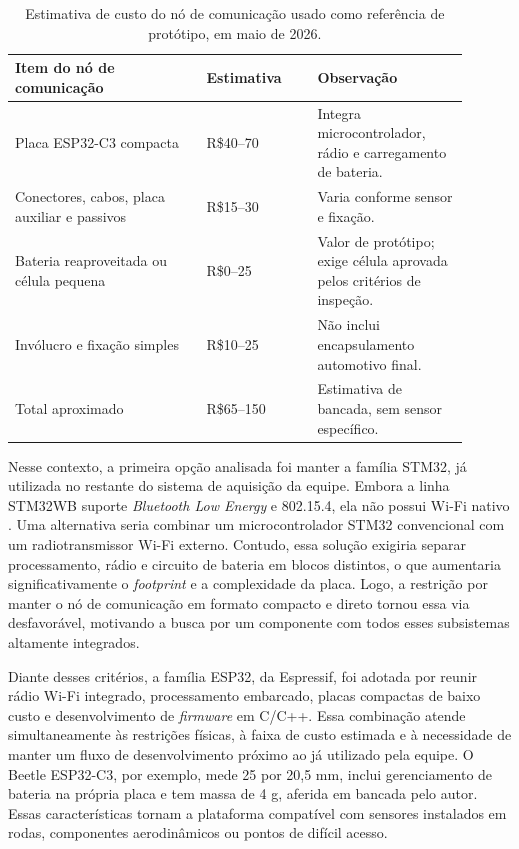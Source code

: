 \begin{table}[htbp]
\centering
\small
\setlength{\tabcolsep}{5pt}
\renewcommand{\arraystretch}{1.12}
\begin{tabular}{p{0.38\linewidth}|p{0.22\linewidth}|p{0.30\linewidth}}
\hline
Item do nó de comunicação & Estimativa & Observação \\
\hline
Placa ESP32-C3 compacta & R\$40--70 & Integra microcontrolador, rádio e carregamento de bateria. \\
\hline
Conectores, cabos, placa auxiliar e passivos & R\$15--30 & Varia conforme sensor e fixação. \\
\hline
Bateria reaproveitada ou célula pequena & R\$0--25 & Valor de protótipo; exige célula aprovada pelos critérios de inspeção. \\
\hline
Invólucro e fixação simples & R\$10--25 & Não inclui encapsulamento automotivo final. \\
\hline
Total aproximado & R\$65--150 & Estimativa de bancada, sem sensor específico. \\
\hline
\end{tabular}
\caption{Estimativa de custo do nó de comunicação usado como referência de protótipo, em maio de 2026.}
\label{tab:bom-no-sensor}
\end{table}

Nesse contexto, a primeira opção analisada foi manter a família STM32, já utilizada no restante do sistema de aquisição da equipe. Embora a linha STM32WB suporte \emph{Bluetooth Low Energy} e 802.15.4, ela não possui Wi-Fi nativo \cite{st_stm32wb_series}. Uma alternativa seria combinar um microcontrolador STM32 convencional com um radiotransmissor Wi-Fi externo. Contudo, essa solução exigiria separar processamento, rádio e circuito de bateria em blocos distintos, o que aumentaria significativamente o \emph{footprint} e a complexidade da placa. Logo, a restrição por manter o nó de comunicação em formato compacto e direto tornou essa via desfavorável, motivando a busca por um componente com todos esses subsistemas altamente integrados.

Diante desses critérios, a família ESP32, da Espressif, foi adotada por reunir
rádio Wi-Fi integrado, processamento embarcado, placas compactas de baixo custo e
desenvolvimento de \emph{firmware} em C/C++. Essa
combinação atende simultaneamente às restrições físicas, à faixa de custo
estimada e à necessidade de manter um fluxo de desenvolvimento próximo ao já
utilizado pela equipe. O Beetle ESP32-C3, por exemplo, mede
25 por 20,5 mm, inclui gerenciamento de bateria na própria placa \cite{dfrobot_beetle_esp32c3} e tem
massa de 4 g, aferida em bancada pelo autor. Essas características tornam a
plataforma compatível com sensores instalados em rodas, componentes aerodinâmicos
ou pontos de difícil acesso.

